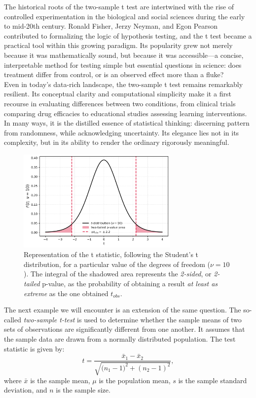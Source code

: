 \documentclass{book}
\begin{document}
The historical roots of the two-sample t test are intertwined with the rise of controlled experimentation in the biological and social sciences during the early to mid-20th century. Ronald Fisher, Jerzy Neyman, and Egon Pearson contributed to formalizing the logic of hypothesis testing, and the t test became a practical tool within this growing paradigm. Its popularity grew not merely because it was mathematically sound, but because it was accessible—a concise, interpretable method for testing simple but essential questions in science: does treatment differ from control, or is an observed effect more than a fluke?\\

Even in today’s data-rich landscape, the two-sample t test remains remarkably resilient. Its conceptual clarity and computational simplicity make it a first recourse in evaluating differences between two conditions, from clinical trials comparing drug efficacies to educational studies assessing learning interventions. In many ways, it is the distilled essence of statistical thinking: discerning pattern from randomness, while acknowledging uncertainty. Its elegance lies not in its complexity, but in its ability to render the ordinary rigorously meaningful.\\

\begin{figure}[ht]
    \centering
    \includegraphics[width=0.7\textwidth]{figures/chapter4/t_test_1_sample_p_two_tailed.png}
    \caption{Representation of the t statistic, following the Student's t distribution, for a particular value of the degrees of freedom ($\nu = 10$). The integral of the shadowed area represents the \textit{2-sided}, or \textit{2-tailed} p-value, as the probability of obtaining a result \textit{at least as extreme} as the one obtained $t_{obs}$.}
    \label{fig:t_test2}
\end{figure}

The next example we will encounter is an extension of the same question. The so-called \textit{two-sample t-test} is used to determine whether the sample means of two sets of observations are significantly different from one another. It assumes that the sample data are drawn from a normally distributed population. The test statistic is given by:
\[
    t = \frac{\bar{x}_{1} - \bar{x}_{2}}{\sqrt{\big(n_{1} - 1)^{2} + (n_{2} - 1)^{2}}},
\]
where $\bar{x}$ is the sample mean, $\mu$ is the population mean, $s$ is the sample standard deviation, and $n$ is the sample size.\\
\end{document}
